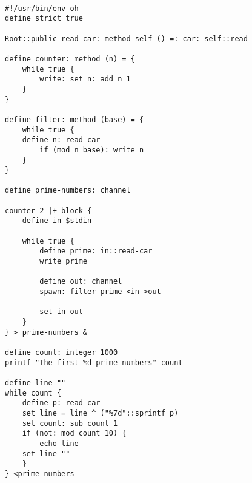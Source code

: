 \documentclass[12pt]{book}
\begin{document}
\begin{lstlisting}

#!/usr/bin/env oh
define strict true

Root::public read-car: method self () =: car: self::read

define counter: method (n) = {
    while true {
        write: set n: add n 1
    }
}

define filter: method (base) = {
    while true {
	define n: read-car
        if (mod n base): write n
    }
}

define prime-numbers: channel

counter 2 |+ block {
    define in $stdin

    while true {
        define prime: in::read-car
        write prime

        define out: channel
        spawn: filter prime <in >out

        set in out
    }
} > prime-numbers &

define count: integer 1000
printf "The first %d prime numbers" count

define line ""
while count {
    define p: read-car
    set line = line ^ ("%7d"::sprintf p)
    set count: sub count 1
    if (not: mod count 10) {
        echo line
	set line ""
    }
} <prime-numbers
\end{lstlisting}




\end{document}
